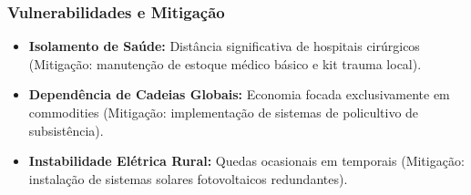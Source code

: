 \subsubsection{Vulnerabilidades e
Mitigação}

\begin{itemize}
\tightlist
\item
  \textbf{Isolamento de Saúde:} Distância significativa de hospitais
  cirúrgicos (Mitigação: manutenção de estoque médico básico e kit
  trauma local).
\item
  \textbf{Dependência de Cadeias Globais:} Economia focada
  exclusivamente em commodities (Mitigação: implementação de sistemas de
  policultivo de subsistência).
\item
  \textbf{Instabilidade Elétrica Rural:} Quedas ocasionais em temporais
  (Mitigação: instalação de sistemas solares fotovoltaicos redundantes).
\end{itemize}

